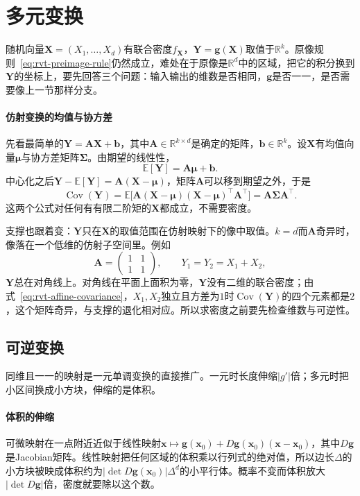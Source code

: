\section{多元变换}
\label{sec:rvt-multivariate}

随机向量$\bm{X}=(X_1,\ldots,X_d)$有联合密度$f_{\bm{X}}$，$\bm{Y}=\bm{g}(\bm{X})$取值于$\mathbb{R}^{k}$。原像规则~\eqref{eq:rvt-preimage-rule}仍然成立，难处在于原像是$\mathbb{R}^{d}$中的区域，把它的积分换到$\bm{Y}$的坐标上，要先回答三个问题：输入输出的维数是否相同，$\bm{g}$是否一一，是否需要像上一节那样分支。

\paragraph{仿射变换的均值与协方差}
先看最简单的$\bm{Y}=\bm{A}\bm{X}+\bm{b}$，其中$\bm{A}\in\mathbb{R}^{k\times d}$是确定的矩阵，$\bm{b}\in\mathbb{R}^{k}$。设$\bm{X}$有均值向量$\bm{\mu}$与协方差矩阵$\bm{\Sigma}$。由期望的线性性，
\[
 \mathbb{E}[\bm{Y}]=\bm{A}\bm{\mu}+\bm{b} .
\]
中心化之后$\bm{Y}-\mathbb{E}[\bm{Y}]=\bm{A}(\bm{X}-\bm{\mu})$，矩阵$\bm{A}$可以移到期望之外，于是
\begin{equation}
 \operatorname{Cov}(\bm{Y})=\mathbb{E}\bigl[\bm{A}(\bm{X}-\bm{\mu})(\bm{X}-\bm{\mu})^{\top}\bm{A}^{\top}\bigr]=\bm{A}\bm{\Sigma}\bm{A}^{\top} .
 \label{eq:rvt-affine-covariance}
\end{equation}
这两个公式对任何有有限二阶矩的$\bm{X}$都成立，不需要密度。

支撑也跟着变：$\bm{Y}$只在$\bm{X}$的取值范围在仿射映射下的像中取值。$k=d$而$\bm{A}$奇异时，像落在一个低维的仿射子空间里。例如
\[
 \bm{A}=\begin{pmatrix}1&1\\1&1\end{pmatrix},\qquad Y_1=Y_2=X_1+X_2 ,
\]
$\bm{Y}$总在对角线上。对角线在平面上面积为零，$\bm{Y}$没有二维的联合密度；由式~\eqref{eq:rvt-affine-covariance}，$X_1,X_2$独立且方差为$1$时$\operatorname{Cov}(\bm{Y})$的四个元素都是$2$，这个矩阵奇异，与支撑的退化相对应。所以求密度之前要先检查维数与可逆性。

\subsection{可逆变换}
\label{sec:rvt-invertible}

同维且一一的映射是一元单调变换的直接推广。一元时长度伸缩$\lvert g'\rvert$倍；多元时把小区间换成小方块，伸缩的是体积。

\paragraph{体积的伸缩}
可微映射在一点附近近似于线性映射$\bm{x}\mapsto\bm{g}(\bm{x}_0)+D\bm{g}(\bm{x}_0)(\bm{x}-\bm{x}_0)$，其中$D\bm{g}$是Jacobian矩阵。线性映射把任何区域的体积乘以行列式的绝对值，所以边长$\Delta$的小方块被映成体积约为$\lvert\det D\bm{g}(\bm{x}_0)\rvert\Delta^{d}$的小平行体。概率不变而体积放大$\lvert\det D\bm{g}\rvert$倍，密度就要除以这个数。

